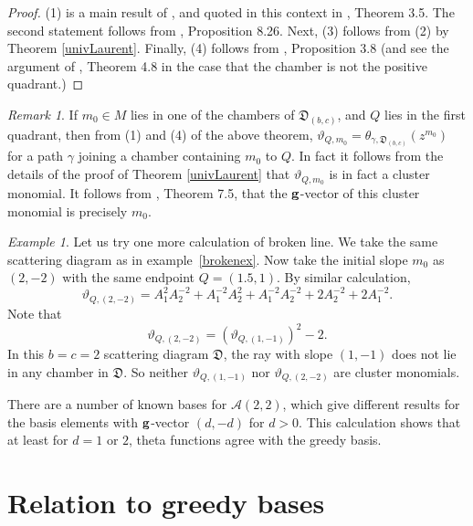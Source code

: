 \documentclass[12pt]{amsart}
\theoremstyle{remark}
\newtheorem{example}[theorem]{Example}
\newtheorem{remark}[theorem]{Remark}
\newcommand{\cA}{\mathcal{A}}
\newcommand{\DD}{\mathfrak{D}}
\begin{document}
\begin{proof}
(1) is a main result of \cite{CPS}, and quoted in this context in
\cite{GHKK}, Theorem 3.5. The second statement follows from
\cite{GHKK}, Proposition 8.26. Next, (3) follows from (2) by Theorem
\ref{univLaurent}. Finally, (4) follows from \cite{GHKK}, Proposition 3.8
(and see the argument of \cite{GHKK}, Theorem 4.8 in the case that
the chamber is not the positive quadrant.)
\end{proof}

\begin{remark}
If $m_0\in M$ lies in one of the chambers of $\DD_{(b,c)}$, and $Q$ lies
in the first quadrant, then from (1) and (4) of the above theorem, 
$\vartheta_{Q,m_0}=\theta_{\gamma,\DD_{(b,c)}}(z^{m_0})$ for a path 
$\gamma$ joining a chamber containing $m_0$ to $Q$. In fact it follows
from the details of the proof of Theorem \ref{univLaurent} 
that $\vartheta_{Q,m_0}$
is in fact a cluster monomial. It follows from \cite{GHKK}, Theorem 7.5,
that the ${\bf g}$-vector of this cluster monomial is precisely $m_0$.
\end{remark}

\begin{example} 
Let us try one more calculation of broken line. We take the same scattering diagram as in example~\ref{brokenex}. Now take the initial slope $m_0$ as $(2,-2)$ with the same endpoint $Q= (1.5,1)$. By similar calculation, 
\[ \vartheta _{Q, (2,-2)}= A_1^2 A_2^{-2} + A_1^{-2}A_2^2 + A_1^{-2}A_2^{-2} + 2 A_2^{-2} + 2A_1^{-2}.  \]
Note that 
\[ \vartheta _{Q, (2,-2)} = (\vartheta_{Q,(1,-1)}) ^2 -2. \]
In this $b=c=2$ scattering diagram $\DD$, the ray with slope $(1,-1)$ does not lie in any chamber in $\DD$. So neither $\vartheta_{Q,(1,-1)}$ nor 
$\vartheta _{Q, (2,-2)}$ are cluster monomials.

There are a number of known bases for $\cA(2,2)$, which give different results
for the basis elements with ${\bf g}$-vector $(d,-d)$ for $d>0$. This
calculation shows that at least for $d=1$ or $2$, theta functions agree
with the greedy basis.
\end{example}


\section{Relation to greedy bases}
\end{document}
